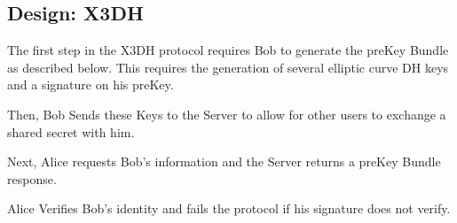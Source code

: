 \documentclass[conference]{IEEEtran}
\begin{document}
\subsection{Design: X3DH}
The first step in the X3DH protocol requires Bob to generate the preKey Bundle as described below. This requires the generation of several elliptic curve DH keys and a signature on his preKey.
\newline
\newline
{}
\newline
\newline

Then, Bob Sends these Keys to the Server to allow for other users to exchange a shared secret with him.
\newline
\newline
{}
\newline

Next, Alice requests Bob's information and the Server returns a preKey Bundle response.
\newline
\newline
{}
\newline
\newline

Alice Verifies Bob's identity and fails the protocol if his signature does not verify.
\newline
\newline
{}
\newline
\newline
\end{document}
